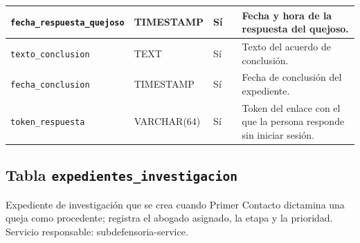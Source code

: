 \begin{longtable}{|L{3.9cm}|L{2.4cm}|L{0.9cm}|L{1.2cm}|L{6.6cm}|}
		\texttt{fecha\_\allowbreak{}respuesta\_\allowbreak{}quejoso} & TIMESTAMP & Sí &  & Fecha y hora de la respuesta del quejoso. \\ \hline
		\texttt{texto\_\allowbreak{}conclusion} & TEXT & Sí &  & Texto del acuerdo de conclusión. \\ \hline
		\texttt{fecha\_\allowbreak{}conclusion} & TIMESTAMP & Sí &  & Fecha de conclusión del expediente. \\ \hline
		\texttt{token\_\allowbreak{}respuesta} & VARCHAR(64) & Sí &  & Token del enlace con el que la persona responde sin iniciar sesión. \\ \hline
\end{longtable}
\normalsize
\setlength{\tabcolsep}{6pt}
\renewcommand{\arraystretch}{1}

\subsection{Tabla \texttt{expedientes\_investigacion}}
Expediente de investigación que se crea cuando Primer Contacto dictamina una queja como procedente; registra el abogado asignado, la etapa y la prioridad. Servicio responsable: subdefensoria-service.


